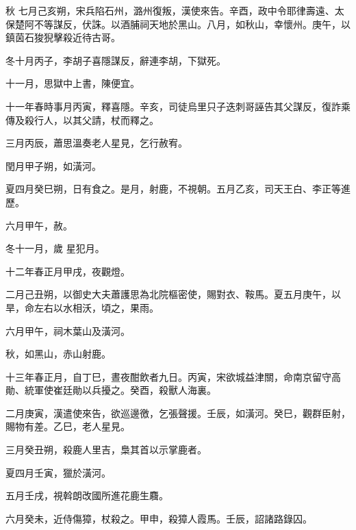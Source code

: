 \begin{pinyinscope}
 秋
 七月己亥朔，宋兵陷石州，潞州復叛，漢使來告。辛酉，政中令耶律壽遠、太保楚阿不等謀反，伏誅。以酒脯祠天地於黑山。八月，如秋山，幸懷州。庚午，以鎮茵石狻猊擊殺近待古哥。



 冬十月丙子，李胡子喜隱謀反，辭連李胡，下獄死。



 十一月，思獄中上書，陳便宜。



 十一年春時事月丙寅，釋喜隱。辛亥，司徒烏里只子迭刺哥誣告其父謀反，復詐乘傳及殺行人，以其父請，杖而釋之。



 三月丙辰，蕭思溫奏老人星見，乞行赦宥。



 閏月甲子朔，如潢河。



 夏四月癸巳朔，日有食之。是月，射鹿，不視朝。五月乙亥，司天王白、李正等進歷。



 六月甲午，赦。



 冬十一月，歲
 星犯月。



 十二年春正月甲戌，夜觀燈。



 二月己丑朔，以御史大夫蕭護思為北院樞密使，賜對衣、鞍馬。夏五月庚午，以旱，命左右以水相沃，頃之，果雨。



 六月甲午，祠木葉山及潢河。



 秋，如黑山，赤山射鹿。



 十三年春正月，自丁巳，晝夜酣飲者九日。丙寅，宋欲城益津關，命南京留守高勛、統軍使崔廷勛以兵擾之。癸酉，殺獸人海裏。



 二月庚寅，漢遣使來告，欲巡邊徼，乞張聲援。壬辰，如潢河。癸巳，觀群臣射，賜物有差。乙巳，老人星見。



 三月癸丑朔，殺鹿人里吉，梟其首以示掌鹿者。



 夏四月壬寅，獵於潢河。



 五月壬戌，視斡朗改國所進花鹿生麛。



 六月癸未，近侍傷獐，杖殺之。甲申，殺獐人霞馬。壬辰，詔諸路錄囚。




\end{pinyinscope}
